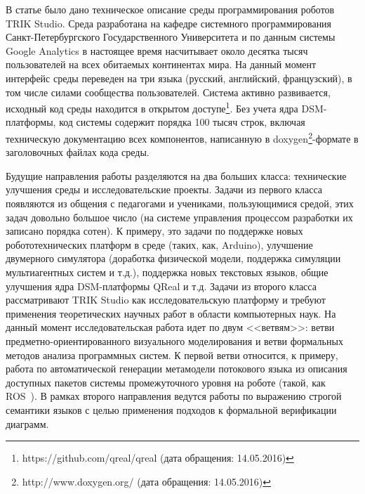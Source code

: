 \documentclass[a5paper]{article}
\begin{document}
В статье было дано техническое описание среды программирования роботов TRIK Studio. Среда разработана на кафедре системного программирования Санкт-Петербургского Государственного Университета и по данным системы Google Analytics в настоящее время насчитывает около десятка тысяч пользователей на всех обитаемых континентах мира. На данный момент интерфейс среды переведен на три языка (русский, английский, французский), в том числе силами сообщества пользователей. Система активно развивается, исходный код среды находится в открытом доступе\footnote{https://github.com/qreal/qreal (дата обращения: 14.05.2016)}. Без учета ядра DSM-платформы, код системы содержит порядка 100 тысяч строк, включая техническую документацию всех компонентов, написанную в doxygen\footnote{http://www.doxygen.org/ (дата обращения: 14.05.2016)}-формате в заголовочных файлах кода среды.

Будущие направления работы разделяются на два больших класса: технические улучшения среды и исследовательские проекты. Задачи из первого класса появляются из общения с педагогами и учениками, пользующимися средой, этих задач довольно большое число (на системе управления процессом разработки их записано порядка сотен). К примеру, это задачи по поддержке новых робототехнических платформ в среде (таких, как, Arduino), улучшение двумерного симулятора (доработка физической модели, поддержка симуляции мультиагентных систем и т.д.), поддержка новых текстовых языков, общие улучшения ядра DSM-платформы QReal и т.д. Задачи из второго класса рассматривают TRIK Studio как исследовательскую платформу и требуют применения теоретических научных работ в области компьютерных наук. На данный момент исследовательская работа идет по двум <<ветвям>>: ветви предметно-ориентированного визуального моделирования и ветви формальных методов анализа программных систем. К первой ветви относится, к примеру, работа по автоматической генерации метамодели потокового языка из описания доступных пакетов системы промежуточного уровня на роботе (такой, как ROS~\cite{quigley2009ros}). В рамках второго направления ведутся работы по выражению строгой семантики языков с целью применения подходов к формальной верификации диаграмм.

\pagebreak



\end{document}
